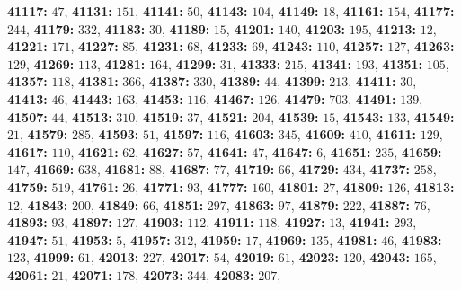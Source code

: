 \textsf{\bfseries 41117:} $47$, \textsf{\bfseries 41131:} $151$, \textsf{\bfseries 41141:} $50$, \textsf{\bfseries 41143:} $104$, \textsf{\bfseries 41149:} $18$, \textsf{\bfseries 41161:} $154$, \textsf{\bfseries 41177:} $244$, \textsf{\bfseries 41179:} $332$, \textsf{\bfseries 41183:} $30$, \textsf{\bfseries 41189:} $15$, \textsf{\bfseries 41201:} $140$, \textsf{\bfseries 41203:} $195$, \textsf{\bfseries 41213:} $12$, \textsf{\bfseries 41221:} $171$, \textsf{\bfseries 41227:} $85$, \textsf{\bfseries 41231:} $68$, \textsf{\bfseries 41233:} $69$, \textsf{\bfseries 41243:} $110$, \textsf{\bfseries 41257:} $127$, \textsf{\bfseries 41263:} $129$, \textsf{\bfseries 41269:} $113$, \textsf{\bfseries 41281:} $164$, \textsf{\bfseries 41299:} $31$, \textsf{\bfseries 41333:} $215$, \textsf{\bfseries 41341:} $193$, \textsf{\bfseries 41351:} $105$, \textsf{\bfseries 41357:} $118$, \textsf{\bfseries 41381:} $366$, \textsf{\bfseries 41387:} $330$, \textsf{\bfseries 41389:} $44$, \textsf{\bfseries 41399:} $213$, \textsf{\bfseries 41411:} $30$, \textsf{\bfseries 41413:} $46$, \textsf{\bfseries 41443:} $163$, \textsf{\bfseries 41453:} $116$, \textsf{\bfseries 41467:} $126$, \textsf{\bfseries 41479:} $703$, \textsf{\bfseries 41491:} $139$, \textsf{\bfseries 41507:} $44$, \textsf{\bfseries 41513:} $310$, \textsf{\bfseries 41519:} $37$, \textsf{\bfseries 41521:} $204$, \textsf{\bfseries 41539:} $15$, \textsf{\bfseries 41543:} $133$, \textsf{\bfseries 41549:} $21$, \textsf{\bfseries 41579:} $285$, \textsf{\bfseries 41593:} $51$, \textsf{\bfseries 41597:} $116$, \textsf{\bfseries 41603:} $345$, \textsf{\bfseries 41609:} $410$, \textsf{\bfseries 41611:} $129$, \textsf{\bfseries 41617:} $110$, \textsf{\bfseries 41621:} $62$, \textsf{\bfseries 41627:} $57$, \textsf{\bfseries 41641:} $47$, \textsf{\bfseries 41647:} $6$, \textsf{\bfseries 41651:} $235$, \textsf{\bfseries 41659:} $147$, \textsf{\bfseries 41669:} $638$, \textsf{\bfseries 41681:} $88$, \textsf{\bfseries 41687:} $77$, \textsf{\bfseries 41719:} $66$, \textsf{\bfseries 41729:} $434$, \textsf{\bfseries 41737:} $258$, \textsf{\bfseries 41759:} $519$, \textsf{\bfseries 41761:} $26$, \textsf{\bfseries 41771:} $93$, \textsf{\bfseries 41777:} $160$, \textsf{\bfseries 41801:} $27$, \textsf{\bfseries 41809:} $126$, \textsf{\bfseries 41813:} $12$, \textsf{\bfseries 41843:} $200$, \textsf{\bfseries 41849:} $66$, \textsf{\bfseries 41851:} $297$, \textsf{\bfseries 41863:} $97$, \textsf{\bfseries 41879:} $222$, \textsf{\bfseries 41887:} $76$, \textsf{\bfseries 41893:} $93$, \textsf{\bfseries 41897:} $127$, \textsf{\bfseries 41903:} $112$, \textsf{\bfseries 41911:} $118$, \textsf{\bfseries 41927:} $13$, \textsf{\bfseries 41941:} $293$, \textsf{\bfseries 41947:} $51$, \textsf{\bfseries 41953:} $5$, \textsf{\bfseries 41957:} $312$, \textsf{\bfseries 41959:} $17$, \textsf{\bfseries 41969:} $135$, \textsf{\bfseries 41981:} $46$, \textsf{\bfseries 41983:} $123$, \textsf{\bfseries 41999:} $61$, \textsf{\bfseries 42013:} $227$, \textsf{\bfseries 42017:} $54$, \textsf{\bfseries 42019:} $61$, \textsf{\bfseries 42023:} $120$, \textsf{\bfseries 42043:} $165$, \textsf{\bfseries 42061:} $21$, \textsf{\bfseries 42071:} $178$, \textsf{\bfseries 42073:} $344$, \textsf{\bfseries 42083:} $207$, 
